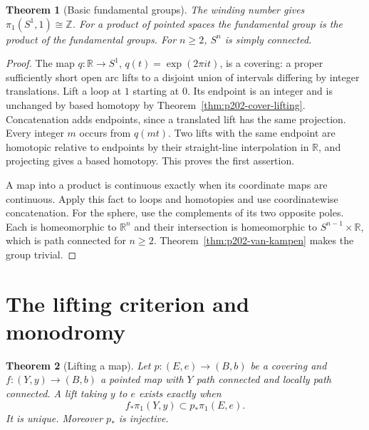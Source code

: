 \documentclass[11pt,oneside,openany]{book}
\theoremstyle{plain}
\newtheorem{theorem}{Theorem}[chapter]
\theoremstyle{definition}
\theoremstyle{remark}
\begin{document}
\begin{theorem}[Basic fundamental groups]
\label{thm:p202-basic-pi1}
The winding number gives \(\pi_1(S^1,1)\cong\mathbb Z\).
For a product of pointed spaces the fundamental group is the
product of the fundamental groups. For \(n\ge2\),
\(S^n\) is simply connected.
\end{theorem}

\begin{proof}
The map \(q:\mathbb R\to S^1\), \(q(t)=\exp(2\pi i t)\),
is a covering: a proper sufficiently short open arc lifts to
a disjoint union of intervals differing by integer
translations. Lift a loop at \(1\) starting at \(0\). Its
endpoint is an integer and is unchanged by based homotopy
by Theorem~\ref{thm:p202-cover-lifting}. Concatenation adds
endpoints, since a translated lift has the same projection.
Every integer \(m\) occurs from \(q(mt)\). Two lifts with the
same endpoint are homotopic relative to endpoints by their
straight-line interpolation in \(\mathbb R\), and projecting
gives a based homotopy. This proves the first assertion.

A map into a product is continuous exactly when its
coordinate maps are continuous. Apply this fact to loops and
homotopies and use coordinatewise concatenation. For the sphere,
use the complements of its two opposite poles. Each is
homeomorphic to \(\mathbb R^n\) and their intersection is
homeomorphic to \(S^{n-1}\times\mathbb R\), which is path
connected for \(n\ge2\). Theorem~\ref{thm:p202-van-kampen}
makes the group trivial.
\end{proof}

\section{The lifting criterion and monodromy}\label{p202:T06}

\begin{theorem}[Lifting a map]
\label{thm:p202-cover-criterion}
Let \(p:(E,e)\to(B,b)\) be a covering and
\(f:(Y,y)\to(B,b)\) a pointed map with \(Y\) path connected
and locally path connected. A lift taking \(y\) to \(e\)
exists exactly when
\[
 f_*\pi_1(Y,y)\subset p_*\pi_1(E,e).
\]
It is unique. Moreover \(p_*\) is injective.
\end{theorem}
\end{document}
